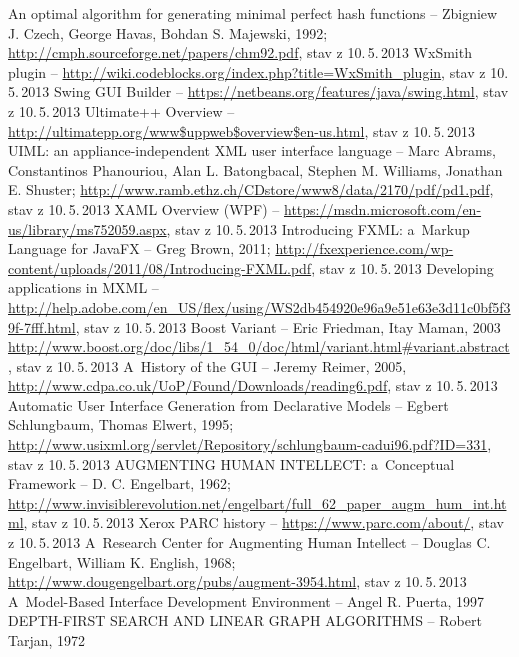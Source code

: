 \documentclass[11pt,twoside,a4paper]{book}
\begin{document}

\begin{thebibliography}{99}
 An optimal algorithm for generating minimal perfect hash functions -- Zbigniew J. Czech, George Havas, Bohdan S. Majewski, 1992; \url{http://cmph.sourceforge.net/papers/chm92.pdf}, stav z 10.\,5.\,2013
 WxSmith plugin -- \url{http://wiki.codeblocks.org/index.php?title=WxSmith_plugin}, stav z 10.\,5.\,2013
 Swing GUI Builder -- \url{https://netbeans.org/features/java/swing.html}, stav z 10.\,5.\,2013
 Ultimate++ Overview -- \url{http://ultimatepp.org/www$uppweb$overview$en-us.html}, stav z 10.\,5.\,2013
 UIML: an appliance-independent XML user interface language -- Marc Abrams, Constantinos Phanouriou, Alan L. Batongbacal, Stephen M. Williams, Jonathan E. Shuster; \url{http://www.ramb.ethz.ch/CDstore/www8/data/2170/pdf/pd1.pdf}, stav z 10.\,5.\,2013
 XAML Overview (WPF) -- \url{https://msdn.microsoft.com/en-us/library/ms752059.aspx}, stav z 10.\,5.\,2013
 Introducing FXML: a~Markup Language for JavaFX -- Greg Brown, 2011; \url{http://fxexperience.com/wp-content/uploads/2011/08/Introducing-FXML.pdf}, stav z 10.\,5.\,2013
 Developing applications in MXML -- \url{http://help.adobe.com/en_US/flex/using/WS2db454920e96a9e51e63e3d11c0bf5f39f-7fff.html}, stav z 10.\,5.\,2013
 Boost Variant -- Eric Friedman, Itay Maman, 2003 \url{http://www.boost.org/doc/libs/1_54_0/doc/html/variant.html#variant.abstract}, stav z 10.\,5.\,2013
 A~History of the GUI -- Jeremy Reimer, 2005, \url{http://www.cdpa.co.uk/UoP/Found/Downloads/reading6.pdf}, stav z 10.\,5.\,2013
 Automatic User Interface Generation from Declarative Models -- Egbert Schlungbaum, Thomas Elwert, 1995; \url{http://www.usixml.org/servlet/Repository/schlungbaum-cadui96.pdf?ID=331}, stav z 10.\,5.\,2013
 AUGMENTING HUMAN INTELLECT: a~Conceptual Framework -- D. C. Engelbart, 1962; \url{http://www.invisiblerevolution.net/engelbart/full_62_paper_augm_hum_int.html}, stav z 10.\,5.\,2013
 Xerox PARC history -- \url{https://www.parc.com/about/}, stav z 10.\,5.\,2013
 A~Research Center for Augmenting Human Intellect -- Douglas C. Engelbart, William K. English, 1968; \url{http://www.dougengelbart.org/pubs/augment-3954.html}, stav z 10.\,5.\,2013
 A~Model-Based Interface Development Environment -- Angel R. Puerta, 1997
 DEPTH-FIRST SEARCH AND LINEAR GRAPH ALGORITHMS -- Robert Tarjan, 1972

\end{thebibliography}
\end{document}
